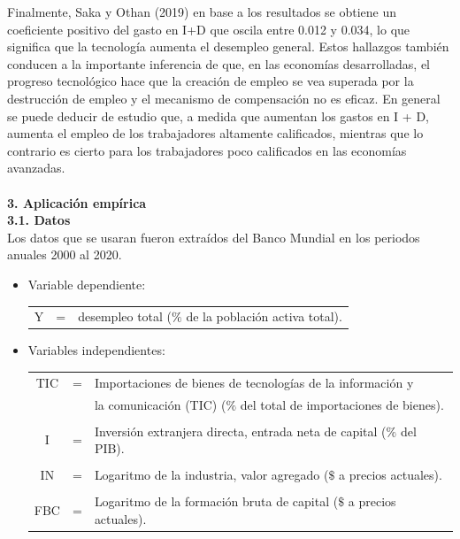 Finalmente, Saka y Othan (2019) en base a los
resultados se obtiene un coeficiente positivo del gasto en I+D que oscila entre 0.012 y 0.034, lo
que significa que la tecnología aumenta el desempleo general. Estos hallazgos también conducen a la importante inferencia de que, en las economías desarrolladas, el progreso tecnológico
hace que la creación de empleo se vea superada por la destrucción de empleo y el mecanismo de
compensación no es eficaz. En general se puede deducir de estudio que, a medida que aumentan
los gastos en I + D, aumenta el empleo de los trabajadores altamente calificados, mientras que
lo contrario es cierto para los trabajadores poco calificados en las economías avanzadas.
\\\\

\textbf{\large 3. Aplicación empírica}\\

\textbf{3.1. Datos}\\

Los datos que se usaran fueron extraídos del Banco Mundial en los periodos anuales 2000 al 2020.

\begin{itemize}
    \item Variable dependiente:
	\begin{center}
	    \begin{tabular}{rcl}
		Y&=& desempleo total ($\%$ de la población activa total).\\ 
	    \end{tabular}
	\end{center}

    \item Variables independientes:
	\begin{center}
	    \begin{tabular}{ccl}
		TIC &=& Importaciones de bienes de tecnologías de la información y\\
			      &&la comunicación (TIC) ($\%$ del total de importaciones de bienes).\\\\
		I &=& Inversión extranjera directa, entrada neta de capital ($\%$ del PIB).\\\\
		IN &=& Logaritmo de la industria, valor agregado ($ \$ $ a precios actuales).\\\\
		FBC &=& Logaritmo de la formación bruta de capital ($ \$ $ a precios actuales).
	    \end{tabular}
	\end{center}
\end{itemize}
\vspace{.5cm}


